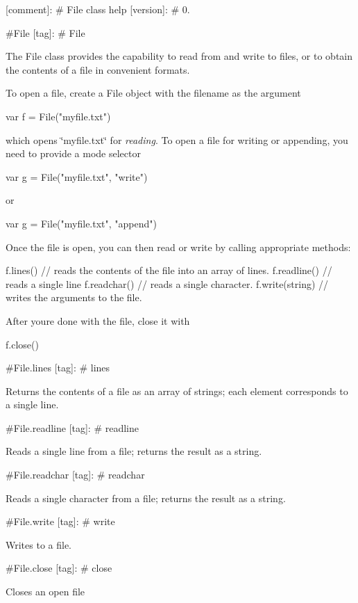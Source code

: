 \mbox{[}comment\mbox{]}\+: \# File class help \mbox{[}version\mbox{]}\+: \# 0.

\#\+File \mbox{[}tag\mbox{]}\+: \# File

The File class provides the capability to read from and write to files, or to obtain the contents of a file in convenient formats.

To open a file, create a File object with the filename as the argument \begin{DoxyVerb}var f = File("myfile.txt")
\end{DoxyVerb}


which opens {\ttfamily \char`\"{}myfile.\+txt\char`\"{}} for {\itshape reading}. To open a file for writing or appending, you need to provide a mode selector \begin{DoxyVerb}var g = File("myfile.txt", "write")
\end{DoxyVerb}


or \begin{DoxyVerb}var g = File("myfile.txt", "append")
\end{DoxyVerb}


Once the file is open, you can then read or write by calling appropriate methods\+: \begin{DoxyVerb}f.lines()            // reads the contents of the file into an array of lines.
f.readline()         // reads a single line
f.readchar()         // reads a single character.
f.write(string)      // writes the arguments to the file.
\end{DoxyVerb}


After you\textquotesingle{}re done with the file, close it with \begin{DoxyVerb}f.close()
\end{DoxyVerb}


\#\+File.\+lines \mbox{[}tag\mbox{]}\+: \# lines

Returns the contents of a file as an array of strings; each element corresponds to a single line.

\#\+File.\+readline \mbox{[}tag\mbox{]}\+: \# readline

Reads a single line from a file; returns the result as a string.

\#\+File.\+readchar \mbox{[}tag\mbox{]}\+: \# readchar

Reads a single character from a file; returns the result as a string.

\#\+File.\+write \mbox{[}tag\mbox{]}\+: \# write

Writes to a file.

\#\+File.\+close \mbox{[}tag\mbox{]}\+: \# close

Closes an open file 
